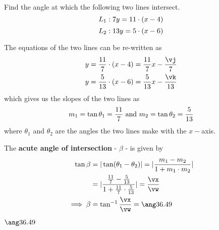 



\MULTIPLY\ve\va\vj
\MULTIPLY\vf\vc\vk
\FRACMINUS\va\vb\vc\vd\vp\vq
\FRACMULT\va\vb\vc\vd\vr\vs
{}\vr\vs\vt\vu
\FRACDIV\vp\vq\vt\vu\vv\vw
\ABSVALUE\vv\vx

\question[3] Find the angle at which the following two lines intersect.  
  \[ L_1: 7 y = 11\cdot(x-4) \]
  \[ L_2: 13 y = 5\cdot(x-6) \]

\watchout

\begin{solution}[\halfpage]
	The equations of the two lines can be re-written as 
  \begin{align}
    y &= \frac\va\vb\cdot(x-\ve) = \frac\va\vb x - \frac\vj\vb \\
    y &= \frac\vc\vd\cdot(x-\vf) = \frac\vc\vd x - \frac\vk\vd
  \end{align}
  which gives us the slopes of the two lines as 
  \[ m_1 = \tan\theta_1 = \frac{11}{7}\text{ and } m_2 = \tan\theta_2 = \frac{5}{13} \]
  where $\theta_1$ and $\theta_2$ are the angles the two lines make with the $x-$axis.

  The \textbf{acute angle of intersection} - $\beta$ - is given by 
  \begin{align}
    \tan\beta &= \vert \tan (\theta_1 - \theta_2 ) \vert = \vert \dfrac{m_1 - m_2}{1+m_1\cdot m_2} \vert \\
              &= \vert \dfrac{\frac\va\vb - \frac\vc\vd}{1+\frac\va\vb\cdot\frac\vc\vd} \vert = \frac\vx\vw \\
              \implies\beta &=\tan^{-1}\frac\vx\vw = \ang\vz
  \end{align}
\end{solution}

\ifprintanswers
  \begin{codex}
    $\ang\vz$
  \end{codex}
\fi


